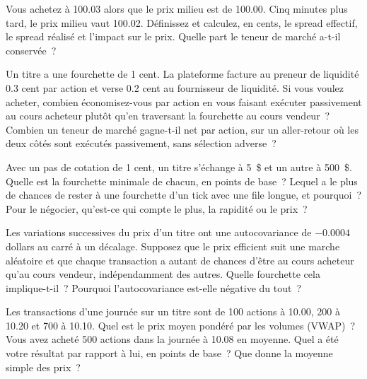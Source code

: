 \begin{question}\label{iq:iv2:markets-and-microstructure:4}
Vous achetez à 100.03 alors que le prix milieu est de 100.00. Cinq minutes plus tard, le prix milieu vaut 100.02. Définissez et calculez, en cents, le spread effectif, le spread réalisé et l'impact sur le prix. Quelle part le teneur de marché a-t-il conservée~?
\end{question}

\begin{question}\label{iq:iv2:markets-and-microstructure:5}
Un titre a une fourchette de 1 cent. La plateforme facture au preneur de liquidité 0.3 cent par action et verse 0.2 cent au fournisseur de liquidité. Si vous voulez acheter, combien économisez-vous par action en vous faisant exécuter passivement au cours acheteur plutôt qu'en traversant la fourchette au cours vendeur~? Combien un teneur de marché gagne-t-il net par action, sur un aller-retour où les deux côtés sont exécutés passivement, sans sélection adverse~?
\end{question}

\begin{question}\label{iq:iv2:markets-and-microstructure:6}
Avec un pas de cotation de 1 cent, un titre s'échange à 5~\$ et un autre à 500~\$. Quelle est la fourchette minimale de chacun, en points de base~? Lequel a le plus de chances de rester à une fourchette d'un tick avec une file longue, et pourquoi~? Pour le négocier, qu'est-ce qui compte le plus, la rapidité ou le prix~?
\end{question}

\begin{question}\label{iq:iv2:markets-and-microstructure:7}
Les variations successives du prix d'un titre ont une autocovariance de $-0.0004$ dollars au carré à un décalage. Supposez que le prix efficient suit une marche aléatoire et que chaque transaction a autant de chances d'être au cours acheteur qu'au cours vendeur, indépendamment des autres. Quelle fourchette cela implique-t-il~? Pourquoi l'autocovariance est-elle négative du tout~?
\end{question}

\begin{question}\label{iq:iv2:markets-and-microstructure:8}
Les transactions d'une journée sur un titre sont de 100 actions à 10.00, 200 à 10.20 et 700 à 10.10. Quel est le prix moyen pondéré par les volumes (VWAP)~? Vous avez acheté 500 actions dans la journée à 10.08 en moyenne. Quel a été votre résultat par rapport à lui, en points de base~? Que donne la moyenne simple des prix~?
\end{question}

